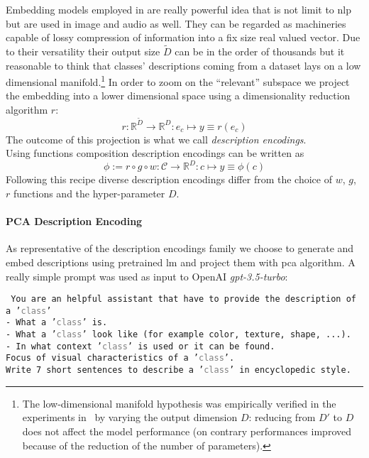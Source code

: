 Embedding models employed in  are really powerful idea
that is not limit to \acrshort{nlp} but are used in image and audio as well.
They can be regarded as machineries capable of lossy compression of information
into a fix size real valued vector. Due to their versatility their output size
$\tilde{D}$ can be in the order of thousands but it reasonable to think that
classes' descriptions coming from a dataset lays on a low dimensional
manifold.\footnote{The low-dimensional manifold hypothesis was empirically
  verified in the experiments in~ by varying the
  output dimension $D$: reducing from $D'$ to $D$ does not affect the model
  performance (on contrary performances improved because of the reduction of the
number of parameters).} In order to zoom on the ``relevant'' subspace we project
the embedding into a lower dimensional space using a dimensionality reduction
algorithm $r$:
\begin{equation}
  r : \mathbb{R}^{\tilde{D}} \to \mathbb{R}^{D} :
  e_c \mapsto y \equiv r(e_c)
  \label{eq:embedding-projection}
\end{equation}
The outcome of this projection is what we call \emph{description
encodings}.\\

Using functions composition description encodings can be written as
\begin{equation}
  \phi := r \circ g \circ w : \mathcal{C} \to \mathbb{R}^{D} :
  c \mapsto y \equiv \phi(c)
  \label{eq:desc-encoding}
\end{equation}
Following this recipe diverse description encodings differ from the choice of
$w$, $g$, $r$  functions and the hyper-parameter $D$.

\paragraph{PCA Description Encoding}\label{par:encoding-desc} As representative
of the description encodings family we choose to generate and embed descriptions
using pretrained \acrshort{lm} and project them with \acrfull{pca} algorithm. A
really simple prompt was used as input to OpenAI \emph{gpt-3.5-turbo}:

\vspace{10pt}

\begin{minipage}{0.9\linewidth}
\texttt{\small
You are an helpful assistant that have to provide the description of a
'\textcolor{gray}{\texttt{class}}'\\
- What a '\textcolor{gray}{\texttt{class}}' is.\\
- What a '\textcolor{gray}{\texttt{class}}' look like (for example color,
texture, shape, ...).\\
- In what context '\textcolor{gray}{\texttt{class}}' is used or it can be
found.\\
Focus of visual characteristics of a '\textcolor{gray}{\texttt{class}}'.\\
Write 7 short sentences to describe a '\textcolor{gray}{\texttt{class}}' in
encyclopedic style.
}
\end{minipage}

